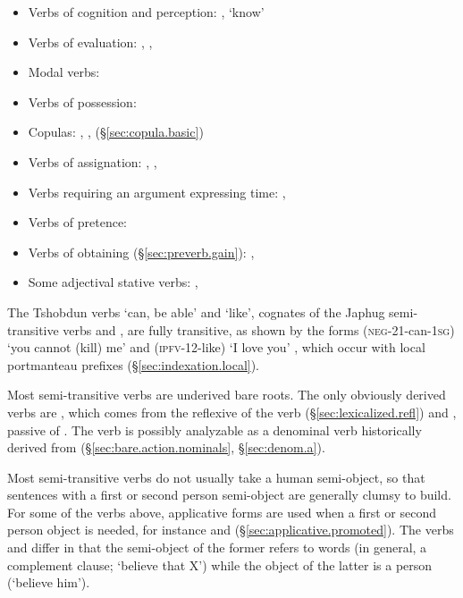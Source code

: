 \begin{itemize}
\item Verbs of cognition and perception: , `know' 
\item Verbs of evaluation: , , 
\item Modal verbs: 
\item Verbs of possession:  
\item Copulas: , ,  (§\ref{sec:copula.basic})
\item Verbs of assignation: , , 
\item Verbs requiring an argument expressing time: , 
\item Verbs of pretence:  
\item Verbs of obtaining (§\ref{sec:preverb.gain}): , 
\item Some adjectival stative verbs: , 
\end{itemize}

The Tshobdun verbs  `can, be able' and  `like', cognates of the Japhug semi-transitive verbs  and , are fully transitive, as shown by the forms  (\textsc{neg}-2\fl{}1-can-\textsc{1sg}) `you cannot (kill) me' \citep[634]{jackson19tshobdun} and   (\textsc{ipfv}-1\fl{}2-like) `I love you' \citep[674]{jackson19tshobdun}, which occur with local portmanteau prefixes (§\ref{sec:indexation.local}).

Most semi-transitive verbs are underived bare roots. The only obviously derived verbs are , which comes from the reflexive of the verb  (§\ref{sec:lexicalized.refl}) and , passive of . The verb  is possibly analyzable as a denominal verb historically derived from  (§\ref{sec:bare.action.nominals}, §\ref{sec:denom.a}).

Most semi-transitive verbs do not usually take a human semi-object, so that sentences with a first or second person semi-object are generally clumsy to build. For some of the verbs above, applicative forms are used when a first or second person object is needed, for instance  and (§\ref{sec:applicative.promoted}). The verbs  and  differ in that the semi-object of the former refers to words (in general, a complement clause; `believe that X') while the object of the latter is a person (`believe him'). 

